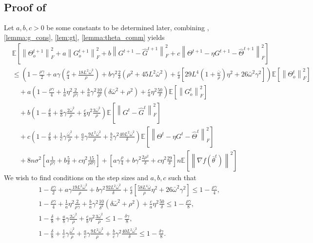 \documentclass[10pt]{article} %
\theoremstyle{plain}
\theoremstyle{definition}
\theoremstyle{remark}
\newcommand{\bw}{\bar{\omega}}
\newcommand{\norm}[1]{\left\| #1 \right\|}
\newcommand{\nl}{\nonumber\\}
\begin{document}
\subsection{Proof of } \label{app:pf_combined}
Let $a, b, c > 0$ be some constants to be determined later, combining , \ref{lemma:g_cons}, \ref{lem:gt}, \ref{lemma:theta_comm} yields
\begin{align}
& \mathbb{E} \left[ \norm{\Theta_o^{t+1}}_F^2 + a \norm{ G_o^{t+1} }_F^2 + b \norm{ G^{t+1} - \hat{G}^{t+1}}_F^2 + c \norm{ \Theta^{t+1} - \eta G^{t+1} - \hat{\Theta}^{t+1} }_F^2 \right] \nl
& \leq \left( 1 - \frac{\rho \gamma}{2} + a \gamma ( \frac{\rho}{4} + \frac{18 L^2 \bw^2}{\rho} ) + b \gamma^2 \frac{2 }{\delta} ( \rho^2 + 45 L^2 \bw^2 ) + \frac{c}{\delta} \left[ 29 L^4 (1 + \frac{\bw}{\rho}) \eta^2 + 26 \bw^2 \gamma^2 \right] \right) \mathbb{E} \left[ \norm{\Theta_o^{t}}_F^2 \right] \nl 
& \quad + a \left( 1 - \frac{\rho \gamma}{4} + \frac{1}{a} \eta^2  \frac{2}{\rho \gamma} + \frac{b}{a} \gamma^2 \frac{10}{\delta^2} (\delta \bw^2 + \rho^2) + \frac{c}{a} \eta^2 \frac{50}{\delta} \right) \mathbb{E} \left[ \norm{G_o^{t}}_F^2 \right] \nl 
& \quad + b \left( 1 - \frac{\delta}{8} + \frac{a}{b} \gamma \frac{2 \bw^2}{\rho} + \frac{c}{b} \eta^2 \frac{3 \bw^2}{\rho} \right) \mathbb{E} \left[ \norm{ G^t - \hat{G}^t }_F^2 \right] \nl
& \quad + c \left( 1 - \frac{\delta}{8} + \frac{1}{c} \gamma \frac{\bw^2}{\rho} + \frac{a}{c} \gamma \frac{9L^2 \bw^2}{\rho} + \frac{b}{c} \gamma^2 \frac{40 L^2 \bw^2}{\delta} \right) \mathbb{E} \left[ \norm{ \Theta^{t} - \eta G^{t} - \hat{\Theta}^{t} }_F^2 \right] \nl 
& \quad + 8n \sigma^2 \left[ a \frac{1}{\rho \gamma} + b \frac{5}{\delta} + c \eta^2 \frac{15}{\rho \delta \gamma} \right]
+ \left[ a \gamma \frac{\rho}{4} + b \gamma^2 \frac{2 \rho^2}{\delta} + c \eta^2 \frac{29}{\delta} \right] n \mathbb{E} \left[ \norm{ \nabla f( \bar{\theta}^t ) }^2 \right] 
\nonumber
\end{align}
We wish to find conditions on the step sizes and $a,b,c$ such that
\begin{align*}
    & 1 - \frac{\rho \gamma}{2} + a \gamma \frac{19 L^2 \bw^2}{\rho} + b \gamma^2 \frac{92 L^2 \bw^2}{\delta} + \frac{c}{\delta} \left[ \frac{ 58 L^4 \bw}{\rho} \eta^2 + 26 \bw^2 \gamma^2 \right] \leq 1 - \frac{\rho\gamma}{4}, \\
    & 1 - \frac{\rho \gamma}{4} + \frac{1}{a} \eta^2  \frac{2}{\rho \gamma} + \frac{b}{a} \gamma^2 \frac{10}{\delta^2} (\delta \bw^2 + \rho^2) + \frac{c}{a} \eta^2 \frac{50}{\delta} \leq 1 - \frac{ \rho \gamma }{ 8 }, \\ 
    & 1 - \frac{\delta}{8} + \frac{a}{b} \gamma \frac{2 \bw^2}{\rho} + \frac{c}{b} \eta^2 \frac{3 \bw^2}{\rho} \leq 1 - \frac{\delta \gamma}{8}, \\
    & 1 - \frac{\delta}{8} + \frac{1}{c} \gamma \frac{\bw^2}{\rho} + \frac{a}{c} \gamma \frac{9L^2 \bw^2}{\rho} + \frac{b}{c} \gamma^2 \frac{40 L^2 \bw^2}{\delta} \leq 1 - \frac{ \delta \gamma }{ 8 }.
\end{align*}
\end{document}
